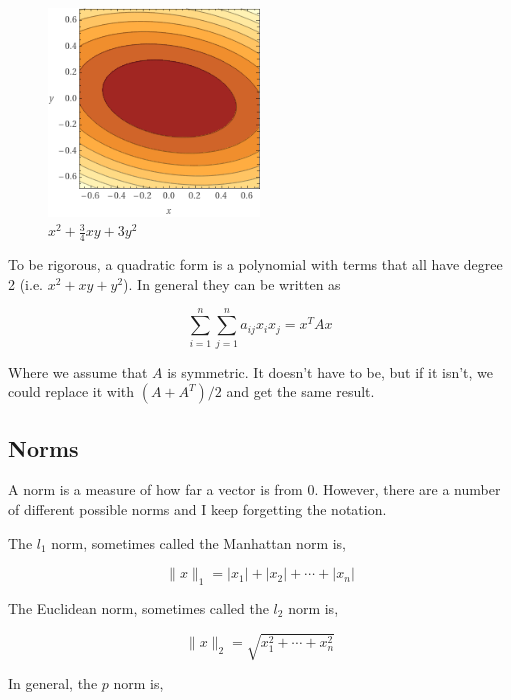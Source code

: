 \documentclass{article}
\begin{document}
\begin{figure}[h!]
    \centering
    \includegraphics[width=0.5\textwidth]{./figures/Quadratic2d.png}
    \caption{$x^2 + \frac{3}{4}xy + 3y^2$}
\end{figure}

\noindent
To be rigorous, a quadratic form is a polynomial with terms that all have degree 2 (i.e. $x^2 + xy + y^2$). In general they can be written as

\begin{equation}
    \sum_{i=1}^{n} \sum_{j=1}^{n} a_{ij} x_i x_j = x^T A x
\end{equation}

\noindent
Where we assume that $A$ is symmetric. It doesn't have to be, but if it isn't, we could replace it with $(A + A^T)/2$ and get the same result.


\subsection{Norms}

A norm is a measure of how far a vector is from 0. However, there are a number of different possible norms and I keep forgetting the notation.

The $l_1$ norm, sometimes called the Manhattan norm is,

\begin{equation}
    \parallel x \parallel_1 = |x_1| + |x_2| + \cdots + |x_n|
\end{equation}

\noindent
The Euclidean norm, sometimes called the $l_2$ norm is,

\begin{equation}
    \parallel x \parallel_2 = \sqrt{x_1^2 + \cdots + x_n^2}
\end{equation}

\noindent
In general, the $p$ norm is,
\end{document}
